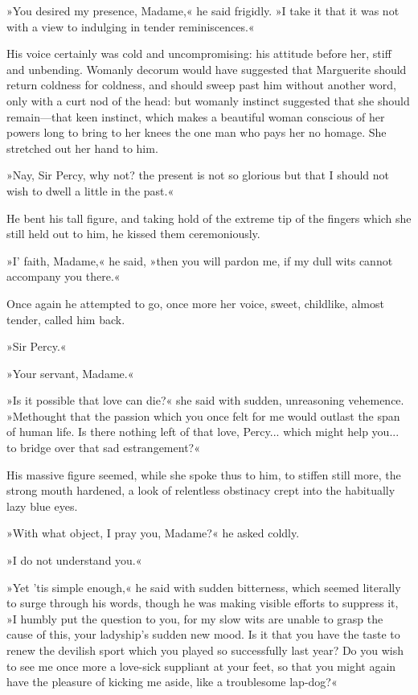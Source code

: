 »You desired my presence, Madame,« he said frigidly. »I take it that it was not with a view to indulging in tender reminiscences.«

His voice certainly was cold and uncompromising: his attitude before her, stiff and unbending. Womanly decorum would have suggested that Marguerite should return coldness for coldness, and should sweep past him without another word, only with a curt nod of the head: but womanly instinct suggested that she should remain\allowbreak---\allowbreak that keen instinct, which makes a beautiful woman conscious of her powers long to bring to her knees the one man who pays her no homage. She stretched out her hand to him.

»Nay, Sir Percy, why not? the present is not so glorious but that I should not wish to dwell a little in the past.«

He bent his tall figure, and taking hold of the extreme tip of the fingers which she still held out to him, he kissed them ceremoniously.

»I' faith, Madame,« he said, »then you will pardon me, if my dull wits cannot accompany you there.«

Once again he attempted to go, once more her voice, sweet, childlike, almost tender, called him back.

»Sir Percy.«

»Your servant, Madame.«

»Is it possible that love can die?« she said with sudden, unreasoning vehemence. »Methought that the passion which you once felt for me would outlast the span of human life. Is there nothing left of that love, Percy... which might help you... to bridge over that sad estrangement?«

His massive figure seemed, while she spoke thus to him, to stiffen still more, the strong mouth hardened, a look of relentless obstinacy crept into the habitually lazy blue eyes.

»With what object, I pray you, Madame?« he asked coldly.

»I do not understand you.«

»Yet 'tis simple enough,« he said with sudden bitterness, which seemed literally to surge through his words, though he was making visible efforts to suppress it, »I humbly put the question to you, for my slow wits are unable to grasp the cause of this, your ladyship's sudden new mood. Is it that you have the taste to renew the devilish sport which you played so successfully last year? Do you wish to see me once more a love-sick suppliant at your feet, so that you might again have the pleasure of kicking me aside, like a troublesome lap-dog?«

